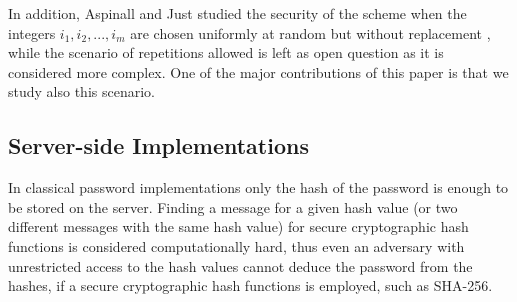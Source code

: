 \documentclass{llncs}
\begin{document}
In addition, Aspinall and Just studied the security of the scheme when the integers $i_1,i_2,...,i_m$  are
chosen uniformly at random but without replacement \cite{FC13paper},
while the scenario of repetitions allowed is left as open question as it is 
considered more complex. One of the major contributions of this paper is that we study also this scenario.



\newpage

\subsection{Server-side Implementations}
\label{ssimpelm}


In classical password implementations only the hash of the password is enough to be stored on the server. 
Finding a message for a given hash value (or two different messages with the same hash value) for secure cryptographic hash functions is considered computationally 
hard, thus even an adversary with unrestricted access to the 
hash values cannot deduce the password from the hashes, if a secure cryptographic hash functions is employed, such as SHA-256. 
\end{document}

